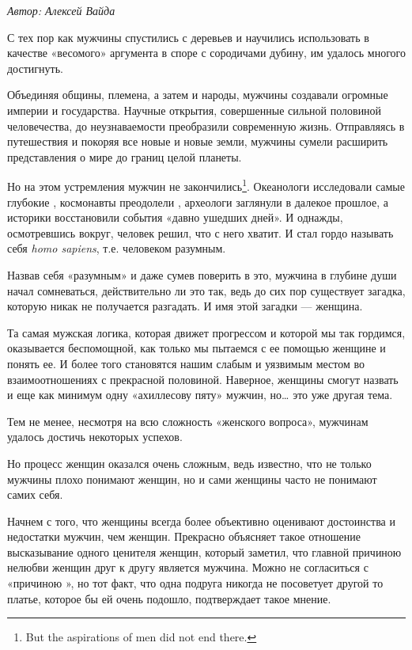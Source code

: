 \textit{Автор: Алексей Вайда}

С тех пор как мужчины спустились с деревьев и научились использовать в качестве «весомого» аргумента в споре с сородичами дубину, им удалось многого достигнуть.

Объединяя общины, племена, а затем и народы, мужчины создавали огромные империи и государства. Научные открытия, совершенные сильной половиной человечества, до неузнаваемости преобразили современную жизнь. Отправляясь в путешествия и покоряя все новые и новые земли, мужчины сумели расширить представления о мире до границ целой планеты.

Но на этом устремления мужчин не закончились\footnote{But the aspirations of men did not end there.}. Океанологи исследовали самые глубокие , космонавты преодолели , археологи заглянули в далекое прошлое, а историки восстановили события «давно ушедших дней». И однажды, осмотревшись вокруг, человек решил, что с него хватит. И стал гордо называть себя \textit{homo sapiens}, т.е. человеком разумным.

Назвав себя «разумным» и даже сумев поверить в это, мужчина в глубине души начал сомневаться, действительно ли это так, ведь до сих пор существует загадка, которую никак не получается разгадать. И имя этой загадки --- женщина.

Та самая мужская логика, которая движет прогрессом и которой мы так гордимся, оказывается беспомощной, как только мы пытаемся с ее помощью  женщине и понять ее. И более того  становятся нашим слабым и уязвимым местом во взаимоотношениях с прекрасной половиной. Наверное, женщины смогут назвать и еще как минимум одну «ахиллесову пяту» мужчин, но… это уже другая тема.

Тем не менее, несмотря на всю сложность «женского вопроса», мужчинам удалось достичь некоторых успехов.

Но процесс  женщин оказался очень сложным, ведь известно, что не только мужчины плохо понимают женщин, но и сами женщины часто не понимают самих себя.

Начнем с того, что женщины всегда более объективно оценивают достоинства и недостатки мужчин, чем женщин. Прекрасно объясняет такое  отношение высказывание одного ценителя женщин, который заметил, что главной причиною нелюбви женщин друг к другу является мужчина. Можно не согласиться с «причиною », но тот факт, что одна подруга никогда не посоветует другой то платье, которое бы ей очень подошло,  подтверждает такое мнение.


